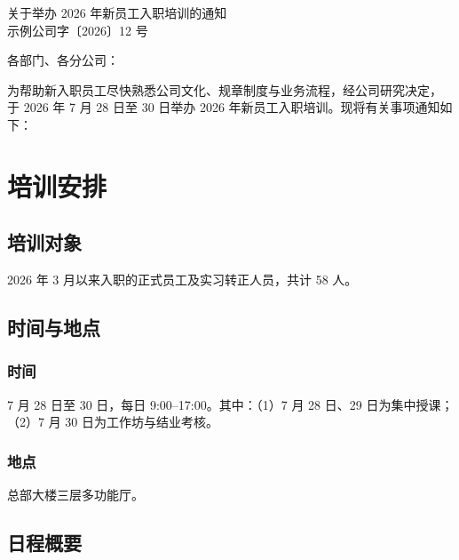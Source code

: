 \documentclass[zihao=-4]{ctexart}   %
\begin{document}
\begin{center}
  {\heiti 关于举办 2026 年新员工入职培训的通知}\\[0.8ex]
  {\fangsong 示例公司字〔2026〕12 号}
\end{center}


\noindent 各部门、各分公司：

为帮助新入职员工尽快熟悉公司文化、规章制度与业务流程，经公司研究决定，
于 2026 年 7 月 28 日至 30 日举办 2026 年新员工入职培训。现将有关事项通知如下：

\section{培训安排}

\subsection{培训对象}

2026 年 3 月以来入职的正式员工及实习转正人员，共计 58 人。

\subsection{时间与地点}

\subsubsection{时间}

7 月 28 日至 30 日，每日 9:00–17:00。其中：（1）7 月 28 日、29 日为集中授课；
（2）7 月 30 日为工作坊与结业考核。

\subsubsection{地点}

总部大楼三层多功能厅。

\subsection{日程概要}
\end{document}
